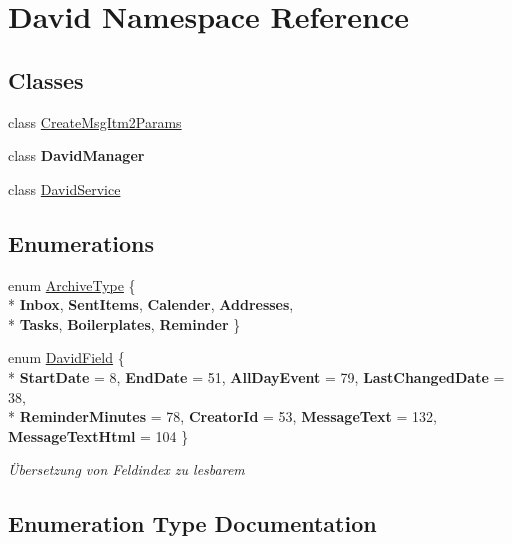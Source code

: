\hypertarget{namespace_david}{}\section{David Namespace Reference}
\label{namespace_david}
\subsection*{Classes}
\begin{DoxyCompactItemize}
\item 
class \hyperlink{class_david_1_1_create_msg_itm2_params}{Create\+Msg\+Itm2\+Params}
\item 
class {\bfseries David\+Manager}
\item 
class \hyperlink{class_david_1_1_david_service}{David\+Service}
\end{DoxyCompactItemize}
\subsection*{Enumerations}
\begin{DoxyCompactItemize}
\item 
enum \hyperlink{namespace_david_a2d1a5df179d8a1b80864c994cca79cfa}{Archive\+Type} \{ \\*
{\bfseries Inbox}, 
{\bfseries Sent\+Items}, 
{\bfseries Calender}, 
{\bfseries Addresses}, 
\\*
{\bfseries Tasks}, 
{\bfseries Boilerplates}, 
{\bfseries Reminder}
 \}
\item 
enum \hyperlink{namespace_david_a0d17e537424ac42d1893cdde1d1cf65f}{David\+Field} \{ \\*
{\bfseries Start\+Date} = 8, 
{\bfseries End\+Date} = 51, 
{\bfseries All\+Day\+Event} = 79, 
{\bfseries Last\+Changed\+Date} = 38, 
\\*
{\bfseries Reminder\+Minutes} = 78, 
{\bfseries Creator\+Id} = 53, 
{\bfseries Message\+Text} = 132, 
{\bfseries Message\+Text\+Html} = 104
 \}\begin{DoxyCompactList}\small\item\em Übersetzung von Feldindex zu lesbarem \end{DoxyCompactList}
\end{DoxyCompactItemize}


\subsection{Enumeration Type Documentation}
